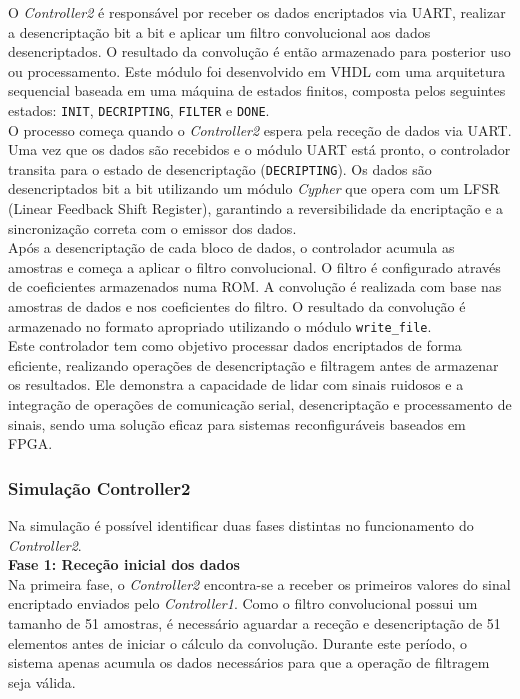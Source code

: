 \documentclass[12pt, a4paper]{article}
\begin{document}
O \textit{Controller2} é responsável por receber os dados encriptados via UART, realizar a desencriptação bit a bit e aplicar um filtro convolucional aos dados desencriptados. O resultado da convolução é então armazenado para posterior uso ou processamento.  
Este módulo foi desenvolvido em VHDL com uma arquitetura sequencial baseada em uma máquina de estados finitos, composta pelos seguintes estados: \texttt{INIT}, \texttt{DECRIPTING}, \texttt{FILTER} e \texttt{DONE}.\\

O processo começa quando o \textit{Controller2} espera pela receção de dados via UART. Uma vez que os dados são recebidos e o módulo UART está pronto, o controlador transita para o estado de desencriptação (\texttt{DECRIPTING}). Os dados são desencriptados bit a bit utilizando um módulo \textit{Cypher} que opera com um LFSR (Linear Feedback Shift Register), garantindo a reversibilidade da encriptação e a sincronização correta com o emissor dos dados.\\

Após a desencriptação de cada bloco de dados, o controlador acumula as amostras e começa a aplicar o filtro convolucional. O filtro é configurado através de coeficientes armazenados numa ROM. A convolução é realizada com base nas amostras de dados e nos coeficientes do filtro. O resultado da convolução é armazenado no formato apropriado utilizando o módulo \texttt{write\_file}.\\

Este controlador tem como objetivo processar dados encriptados de forma eficiente, realizando operações de desencriptação e filtragem antes de armazenar os resultados. Ele demonstra a capacidade de lidar com sinais ruidosos e a integração de operações de comunicação serial, desencriptação e processamento de sinais, sendo uma solução eficaz para sistemas reconfiguráveis baseados em FPGA.

\subsubsection{Simulação Controller2}
Na simulação é possível identificar duas fases distintas no funcionamento do \textit{Controller2}.\\

\textbf{Fase 1: Receção inicial dos dados}\\

Na primeira fase, o \textit{Controller2} encontra-se a receber os primeiros valores do sinal encriptado enviados pelo \textit{Controller1}. Como o filtro convolucional possui um tamanho de 51 amostras, é necessário aguardar a receção e desencriptação de 51 elementos antes de iniciar o cálculo da convolução. Durante este período, o sistema apenas acumula os dados necessários para que a operação de filtragem seja válida.
\end{document}
